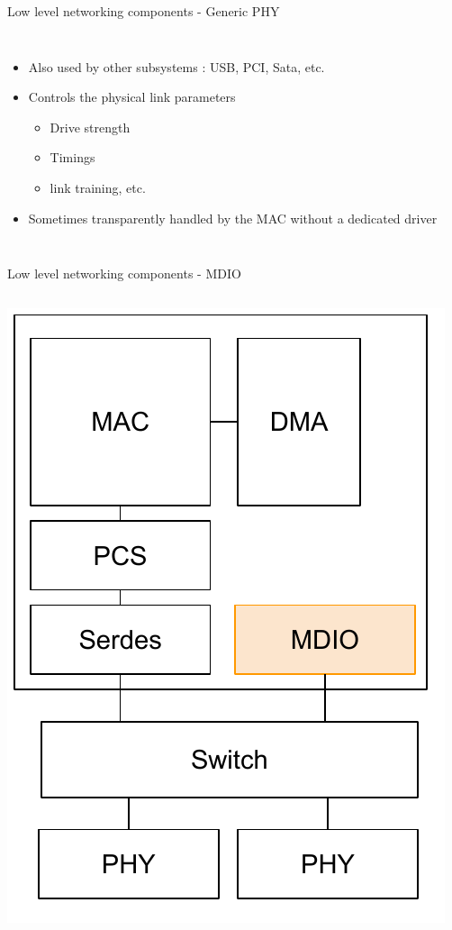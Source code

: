 \begin{frame}{Low level networking components - Generic PHY}
\begin{columns}
\begin{itemize}
			\item Also used by other subsystems : USB, PCI, Sata, etc.
			\item Controls the physical link parameters
				\begin{itemize}
					\item Drive strength
					\item Timings
					\item link training, etc.
				\end{itemize}
			\item Sometimes transparently handled by the MAC without a dedicated driver
		\end{itemize}
	\end{columns}
\end{frame}

\begin{frame}{Low level networking components - MDIO}
	\begin{columns}
			\includegraphics[width=1.1\textwidth]{slides/networking-driver-overview/net_components_mdio.pdf}

\end{columns}
\end{frame}
